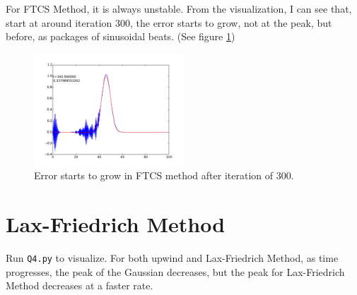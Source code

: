 \documentclass[11pt,letterpaper]{article}
\begin{document}
For FTCS Method, it is always unstable. From the visualization, I can see that, start at around iteration 300, the error starts to grow, not at the peak, but before, as packages of sinusoidal beats. (See figure \ref{fig:Stability})

\begin{figure}[h!]
	\centering
	\includegraphics[width=0.5\textwidth]{Instability}
	\caption{Error starts to grow in FTCS method after iteration of 300.}
	\label{fig:Stability}
\end{figure}

\section{Lax-Friedrich Method}
Run \texttt{Q4.py} to visualize. For both upwind and Lax-Friedrich Method, as time progresses, the peak of the Gaussian decreases, but the peak for Lax-Friedrich Method decreases at a faster rate.	
	
\end{document}
